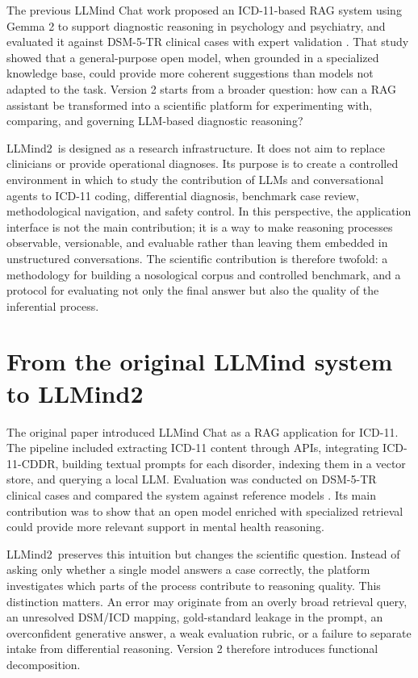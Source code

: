 \documentclass[11pt,a4paper]{article}
\newcommand{\llmind}{LLMind2}
\begin{document}
The previous LLMind Chat work proposed an ICD-11-based RAG system using Gemma 2 to support diagnostic reasoning in psychology and psychiatry, and evaluated it against DSM-5-TR clinical cases with expert validation \citep{cremaschi2025decoding}. That study showed that a general-purpose open model, when grounded in a specialized knowledge base, could provide more coherent suggestions than models not adapted to the task. Version 2 starts from a broader question: how can a RAG assistant be transformed into a scientific platform for experimenting with, comparing, and governing LLM-based diagnostic reasoning?

\llmind\ is designed as a research infrastructure. It does not aim to replace clinicians or provide operational diagnoses. Its purpose is to create a controlled environment in which to study the contribution of LLMs and conversational agents to ICD-11 coding, differential diagnosis, benchmark case review, methodological navigation, and safety control. In this perspective, the application interface is not the main contribution; it is a way to make reasoning processes observable, versionable, and evaluable rather than leaving them embedded in unstructured conversations. The scientific contribution is therefore twofold: a methodology for building a nosological corpus and controlled benchmark, and a protocol for evaluating not only the final answer but also the quality of the inferential process.

\section{From the original LLMind system to \llmind}
The original paper introduced LLMind Chat as a RAG application for ICD-11. The pipeline included extracting ICD-11 content through APIs, integrating ICD-11-CDDR, building textual prompts for each disorder, indexing them in a vector store, and querying a local LLM. Evaluation was conducted on DSM-5-TR clinical cases and compared the system against reference models \citep{cremaschi2025decoding}. Its main contribution was to show that an open model enriched with specialized retrieval could provide more relevant support in mental health reasoning.

\llmind\ preserves this intuition but changes the scientific question. Instead of asking only whether a single model answers a case correctly, the platform investigates which parts of the process contribute to reasoning quality. This distinction matters. An error may originate from an overly broad retrieval query, an unresolved DSM/ICD mapping, gold-standard leakage in the prompt, an overconfident generative answer, a weak evaluation rubric, or a failure to separate intake from differential reasoning. Version 2 therefore introduces functional decomposition.
\end{document}
